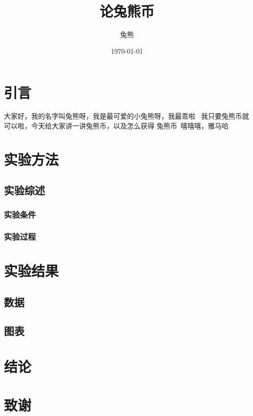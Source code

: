 \documentclass{article}
\title{\heiti 论兔熊币}
\author{\kaishu 兔熊}
\date{\today}
\begin{document}
    \maketitle
    \section{引言}
        大家好，我的名字叫兔熊呀，我是最可爱的小兔熊呀，我最乖啦~
        我只要兔熊币就可以啦，今天给大家讲一讲兔熊币，以及怎么获得
        兔熊币~嘻嘻嘻，雅马哈
    \section{实验方法}
    \subsection{实验综述}
    \subsubsection{实验条件}
    \subsubsection{实验过程}
    \section{实验结果}
    \subsection{数据}
    \subsection{图表}
    \section{结论}
    \section{致谢}
\end{document}
